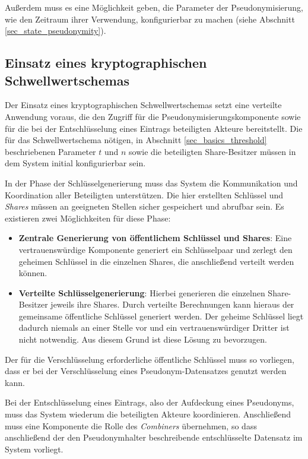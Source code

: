 Außerdem muss es eine Möglichkeit geben, die Parameter der Pseudonymisierung, wie den Zeitraum ihrer Verwendung, konfigurierbar zu machen (siehe Abschnitt \ref{sec_state_pseudonymity}).

\subsection{Einsatz eines kryptographischen Schwellwertschemas}

\label{subsec_impl_requirements_threshold}


Der Einsatz eines kryptographischen Schwellwertschemas setzt eine verteilte Anwendung voraus, die den Zugriff für die Pseudonymisierungskomponente sowie für die bei der Entschlüsselung eines Eintrags beteiligten Akteure bereitstellt. Die für das Schwellwertschema nötigen, in Abschnitt \ref{sec_basics_threshold} beschriebenen Parameter \(t\) und \(n\)  sowie die beteiligten Share-Besitzer müssen in dem System initial konfigurierbar sein.

In der Phase der Schlüsselgenerierung muss das System die Kommunikation und Koordination aller Beteiligten unterstützen. Die hier erstellten Schlüssel und \textit{Shares} müssen an geeigneten Stellen sicher gespeichert und abrufbar sein. Es existieren zwei Möglichkeiten für diese Phase:
\begin{itemize}
  \item \textbf{Zentrale Generierung von öffentlichem Schlüssel und Shares}: Eine vertrauenswürdige Komponente generiert ein Schlüsselpaar und zerlegt den geheimen Schlüssel in die einzelnen Shares, die anschließend verteilt werden können. 
  \item \textbf{Verteilte Schlüsselgenerierung}: Hierbei generieren die einzelnen Share-Besitzer jeweils ihre Shares. Durch verteilte Berechnungen kann hieraus der gemeinsame öffentliche Schlüssel generiert werden. Der geheime Schlüssel liegt dadurch niemals an einer Stelle vor und ein vertrauenswürdiger Dritter ist nicht notwendig. Aus diesem Grund ist diese Lösung zu bevorzugen.
\end{itemize}

Der für die Verschlüsselung erforderliche öffentliche Schlüssel muss so vorliegen, dass er bei der Verschlüsselung eines Pseudonym-Datensatzes genutzt werden kann.

Bei der Entschlüsselung eines Eintrags, also der Aufdeckung eines Pseudonyms, muss das System wiederum die beteiligten Akteure koordinieren. Anschließend muss eine Komponente die Rolle des \textit{Combiners} übernehmen, so dass anschließend der den Pseudonymhalter beschreibende entschlüsselte Datensatz im System  vorliegt.

